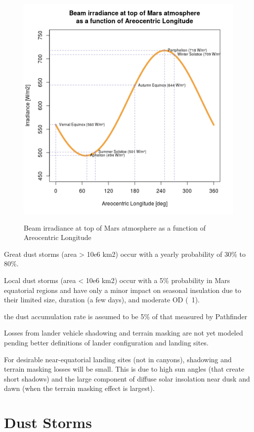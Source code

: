 \begin{figure}[H]%
  \centering
  \hypersetup{linkcolor=captionTextColor}
  \includegraphics[width=0.8\linewidth]{sections/martian-environment/plots/beam-irradiance-at-top-of-mars-atmosphere-as-a-function-of-areocentric-longitude.png}\\
  \caption[Beam irradiance at top of Mars atmosphere as a function of Areocentric Longitude]
          {Beam irradiance at top of Mars atmosphere as a function of Areocentric Longitude}
  \label{fig:plot:beam-irradiance-top-of-mars-atmosphere}
\end{figure}

Great dust storms (area > 10e6 km2) occur with a yearly probability of 30\% to 80\%. 

Local dust storms (area < 10e6 km2) occur with a 5\% probability in Mars equatorial regions and have only a minor impact on seasonal insulation due to their limited size, duration (a few days), and moderate OD (~1). 

the dust accumulation rate is assumed to be 5\% of that measured by Pathfinder 

Losses from lander vehicle shadowing and terrain masking are not yet modeled pending better definitions of lander configuration and landing sites. 

For desirable near-equatorial landing sites (not in canyons), shadowing and terrain masking losses will be small. This is due to high sun angles (that create short shadows) and the large component of diffuse solar insolation near dusk and dawn (when the terrain masking effect is largest). 


\section{Dust Storms}
\label{sec:MartianEnvironment:DustStorms}
%
